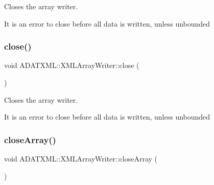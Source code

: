 Closes the array writer. 

It is an error to close before all data is written, unless unbounded \mbox{\label{classADATXML_1_1XMLArrayWriter_a89774ac16fd8636da94745ccba7add0a}} 
\subsubsection{\texorpdfstring{close()}{close()}\hspace{0.1cm}{\footnotesize\ttfamily [3/3]}}
{\footnotesize\ttfamily void A\+D\+A\+T\+X\+M\+L\+::\+X\+M\+L\+Array\+Writer\+::close (\begin{DoxyParamCaption}{ }\end{DoxyParamCaption})}



Closes the array writer. 

It is an error to close before all data is written, unless unbounded \mbox{\label{classADATXML_1_1XMLArrayWriter_a5d6b79a0e8add658220f21e5fc138230}} 
\subsubsection{\texorpdfstring{closeArray()}{closeArray()}\hspace{0.1cm}{\footnotesize\ttfamily [1/3]}}
{\footnotesize\ttfamily void A\+D\+A\+T\+X\+M\+L\+::\+X\+M\+L\+Array\+Writer\+::close\+Array (\begin{DoxyParamCaption}{ }\end{DoxyParamCaption})}

